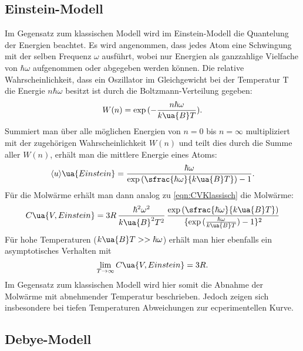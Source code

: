 \subsection{Einstein-Modell}

Im Gegensatz zum klassischen Modell wird im Einstein-Modell die Quantelung der Energien
beachtet. Es wird angenommen, dass jedes Atom eine Schwingung mit der selben Frequenz
$\omega$ ausführt, wobei nur Energien als ganzzahlige Vielfache von $\hbar\omega$
aufgenommen oder abgegeben werden können. Die relative Wahrscheinlichkeit, dass ein
Oszillator im Gleichgewicht bei der Temperatur T die Energie $n\hbar\omega$ besitzt
ist durch die Boltzmann-Verteilung gegeben:
\begin{equation}
  W(n) = \exp {(-\frac{n\hbar\omega}{k\ua{B}T})}.
\end{equation}
Summiert man über alle möglichen Energien von $n=0$ bis $n=\infty$ multipliziert
mit der zugehörigen Wahrscheinlichkeit $W(n)$ und teilt dies durch die Summe aller
$W(n)$, erhält man die mittlere Energie eines Atoms:
\begin{equation}
  \langle u \rangle\ua{Einstein} = \frac{\hbar\omega}{\exp{(\sfrac{\hbar\omega}{k\ua{B}T})-1}}.
\end{equation}
Für die Molwärme erhält man dann analog zu \eqref{eqn:CVKlassisch} die Molwärme:
\begin{equation}
  C\ua{V, Einstein} = 3R \,\frac{\hbar^2\omega^2}{k\ua{B}^2T^2} \,\frac{\exp{(\sfrac{\hbar\omega}{k\ua{B}T})}}{\{\exp{(\frac{\hbar\omega}{k\ua{B}T})}-1\}^2}
\end{equation}
Für hohe Temperaturen ($k\ua{B}T>>\hbar\omega$) erhält man hier ebenfalls ein
asymptotisches Verhalten mit
\begin{equation}
  \lim\limits_{T \rightarrow \infty}{C\ua{V,Einstein}} = 3R.
\end{equation}
Im Gegensatz zum klassischen Modell wird hier somit die Abnahme der Molwärme mit
abnehmender Temperatur beschrieben. Jedoch zeigen sich insbesondere bei tiefen
Temperaturen Abweichungen zur ecperimentellen Kurve.

\subsection{Debye-Modell}
\label{sec:debye}

